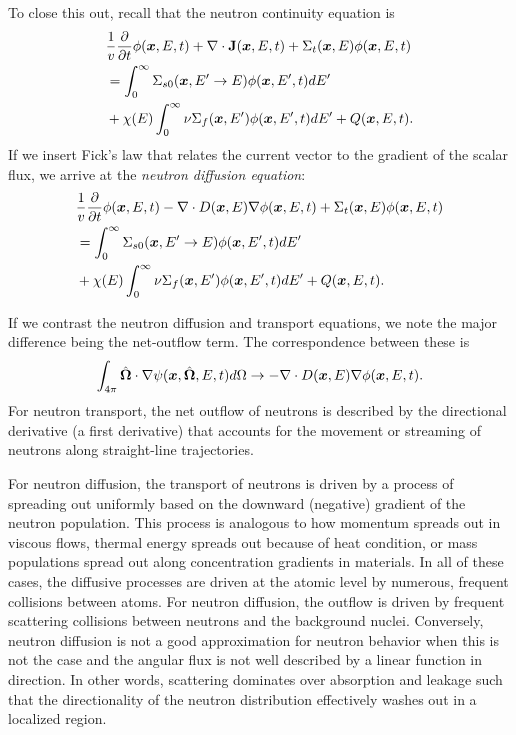 To close this out, recall that the neutron continuity equation is
\begin{align} 
  & \frac{1}{v} \frac{ \partial {} }{ \partial {t} } \phi(\bm{x},E,t) 
  + \nabla \cdot \mathbf{J}(\bm{x},E,t) 
  + \Sigma_t(\bm{x},E) \phi(\bm{x},E,t) \nonumber \\*
  &= \int_0^\infty \Sigma_{s0}(\bm{x}, E' \rightarrow E ) \phi(\bm{x},E',t) dE'  \nonumber \\*
  &+ \chi(E) \int_0^\infty \nu \Sigma_f(\bm{x},E') \phi(\bm{x},E',t) dE'  
   + Q( \bm{x}, E, t ) . \nonumber
\end{align}
If we insert Fick's law that relates the current vector to the gradient of the scalar flux, we arrive at the \emph{neutron diffusion equation}:
\begin{align} 
  & \frac{1}{v} \frac{ \partial {} }{ \partial {t} } \phi(\bm{x},E,t) 
  - \nabla \cdot D(\bm{x},E) \nabla \phi(\bm{x},E,t)
  + \Sigma_t(\bm{x},E) \phi(\bm{x},E,t) \nonumber \\*
  &= \int_0^\infty \Sigma_{s0}(\bm{x}, E' \rightarrow E ) \phi(\bm{x},E',t) dE'  \nonumber \\*
  &+ \chi(E) \int_0^\infty \nu \Sigma_f(\bm{x},E') \phi(\bm{x},E',t) dE'  
   + Q( \bm{x}, E, t ) .
\end{align}

If we contrast the neutron diffusion and transport equations, we note the major difference being the net-outflow term. The correspondence between these is
\begin{align}
  \int_{4\pi} \hat{\mathbf{\Omega}} \cdot \nabla \psi(\bm{x},\hat{\mathbf{\Omega}},E,t) d\Omega \rightarrow -\nabla \cdot D(\bm{x},E) \nabla \phi(\bm{x},E,t) .
\end{align}
For neutron transport, the net outflow of neutrons is described by the directional derivative (a first derivative) that accounts for the movement or streaming of neutrons along straight-line trajectories. 

For neutron diffusion, the transport of neutrons is driven by a process of spreading out uniformly based on the downward (negative) gradient of the neutron population. This process is analogous to how momentum spreads out in viscous flows, thermal energy spreads out because of heat condition, or mass populations spread out along concentration gradients in materials. In all of these cases, the diffusive processes are driven at the atomic level by numerous, frequent collisions between atoms. For neutron diffusion, the outflow is driven by frequent scattering collisions between neutrons and the background nuclei. Conversely, neutron diffusion is not a good approximation for neutron behavior when this is not the case and the angular flux is not well described by a linear function in direction. In other words, scattering dominates over absorption and leakage such that the directionality of the neutron distribution effectively washes out in a localized region.

